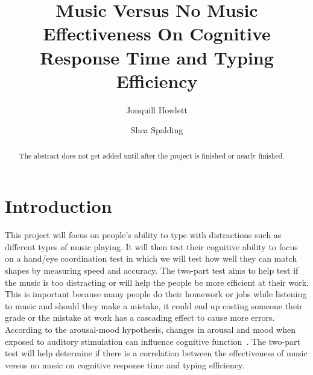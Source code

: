 \documentclass[manuscript, screen, review]{acmart} %
\begin{document}
\title{Music Versus No Music Effectiveness On Cognitive Response Time and Typing Efficiency}

\author{Jonquill Howlett}

\author{Shea Spalding}

\renewcommand{\shortauthors}{Howlett, Spalding}

\begin{abstract}
The abstract does not get added until after the project is finished or nearly finished.
\end{abstract}

\maketitle

\section{Introduction}
This project will focus on people's ability to type with distractions such as different types of music playing. 
It will then test their cognitive ability to focus on a hand/eye coordination test in which we will test how well they can match shapes by measuring speed and accuracy. 
The two-part test aims to help test if the music is too distracting or will help the people be more efficient at their work. 
This is important because many people do their homework or jobs while listening to music and should they make a mistake, it could end up costing someone their grade or the mistake at work has a cascading effect to cause more errors. 
According to the arousal-mood hypothesis, changes in arousal and mood when exposed to auditory stimulation can influence cognitive function~\cite{Chee}.
The two-part test will help determine if there is a correlation between the effectiveness of music versus no music on cognitive response time and typing efficiency. 
\end{document}
